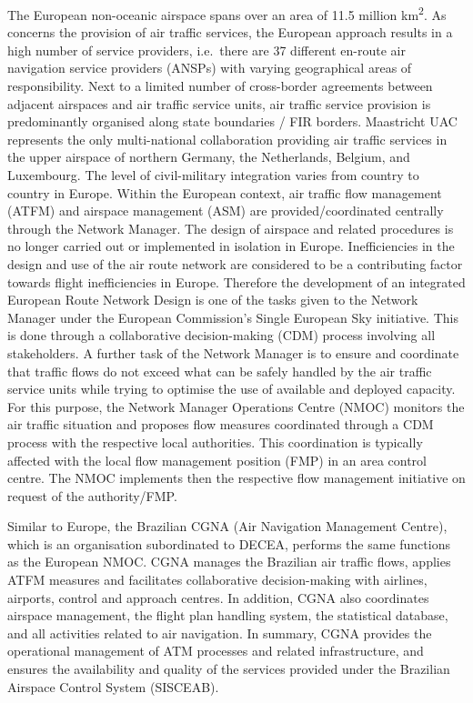 \documentclass[
  a4paper,
  DIV=11,
  numbers=noendperiod]{scrreprt}
\begin{document}
The European non-oceanic airspace spans over an area of 11.5 million
km\textsuperscript{2}. As concerns the provision of air traffic
services, the European approach results in a high number of service
providers, i.e.~there are 37 different en-route air navigation service
providers (ANSPs) with varying geographical areas of responsibility.
Next to a limited number of cross-border agreements between adjacent
airspaces and air traffic service units, air traffic service provision
is predominantly organised along state boundaries / FIR borders.
Maastricht UAC represents the only multi-national collaboration
providing air traffic services in the upper airspace of northern
Germany, the Netherlands, Belgium, and Luxembourg. The level of
civil-military integration varies from country to country in Europe.
Within the European context, air traffic flow management (ATFM) and
airspace management (ASM) are provided/coordinated centrally through the
Network Manager. The design of airspace and related procedures is no
longer carried out or implemented in isolation in Europe. Inefficiencies
in the design and use of the air route network are considered to be a
contributing factor towards flight inefficiencies in Europe. Therefore
the development of an integrated European Route Network Design is one of
the tasks given to the Network Manager under the European Commission's
Single European Sky initiative. This is done through a collaborative
decision-making (CDM) process involving all stakeholders. A further task
of the Network Manager is to ensure and coordinate that traffic flows do
not exceed what can be safely handled by the air traffic service units
while trying to optimise the use of available and deployed capacity. For
this purpose, the Network Manager Operations Centre (NMOC) monitors the
air traffic situation and proposes flow measures coordinated through a
CDM process with the respective local authorities. This coordination is
typically affected with the local flow management position (FMP) in an
area control centre. The NMOC implements then the respective flow
management initiative on request of the authority/FMP.

Similar to Europe, the Brazilian CGNA (Air Navigation Management
Centre), which is an organisation subordinated to DECEA, performs the
same functions as the European NMOC. CGNA manages the Brazilian air
traffic flows, applies ATFM measures and facilitates collaborative
decision-making with airlines, airports, control and approach centres.
In addition, CGNA also coordinates airspace management, the flight plan
handling system, the statistical database, and all activities related to
air navigation. In summary, CGNA provides the operational management of
ATM processes and related infrastructure, and ensures the availability
and quality of the services provided under the Brazilian Airspace
Control System (SISCEAB).
\end{document}
